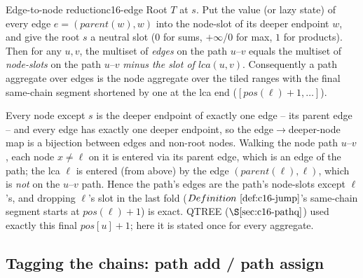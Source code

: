 \begin{proposition}{Edge-to-node reduction}{c16-edge}
Root \(T\) at \(s\).  Put the value (or lazy state) of every edge \(e=(\mathit{parent}(w),w)\) into the node-slot of its deeper endpoint \(w\), and give the root \(s\) a neutral slot (0 for sums, \(+\infty\)/0 for max, \(1\) for products).  Then for any \(u,v\), the multiset of \emph{edges} on the path \(u\)--\(v\) equals the multiset of \emph{node-slots} on the path \(u\)--\(v\) \emph{minus the slot of \(\mathit{lca}(u,v)\)}.  Consequently a path aggregate over edges is the node aggregate over the tiled ranges with the final same-chain segment shortened by one at the lca end (\([\mathit{pos}(\ell)+1,\dots]\)).
\end{proposition}
\begin{proofbox}
Every node except \(s\) is the deeper endpoint of exactly one edge -- its parent edge -- and every edge has exactly one deeper endpoint, so the edge\(\to\)deeper-node map is a bijection between edges and non-root nodes.  Walking the node path \(u\)--\(v\), each node \(x\ne\ell\) on it is entered via its parent edge, which is an edge of the path; the lca \(\ell\) is entered (from above) by the edge \((\mathit{parent}(\ell),\ell)\), which is \emph{not} on the \(u\)--\(v\) path.  Hence the path's edges are the path's node-slots except \(\ell\)'s, and dropping \(\ell\)'s slot in the last fold (\(\defref{c16-jump}\)'s same-chain segment starts at \(\mathit{pos}(\ell)+1\)) is exact.  QTREE (\(\secref{c16-pathq}\)) used exactly this final \(\mathit{pos}[u]+1\); here it is stated once for every aggregate.
\end{proofbox}

\subsection{Tagging the chains: path add / path assign}

